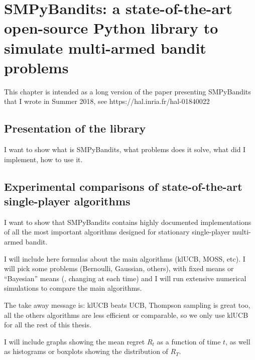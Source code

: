 
\chapter{SMPyBandits: a state-of-the-art open-source Python library to simulate multi-armed bandit problems}
\label{chapter:3}
\minitoc
\newpage
\graphicspath{{2-Chapters/3-Chapter/Images/}}

This chapter is intended as a long version of the paper presenting SMPyBandits that I wrote in Summer 2018, see https://hal.inria.fr/hal-01840022


\section{Presentation of the library}
\label{sec:3:presentationLibrary}

I want to show what is SMPyBandits, what problems does it solve, what did I implement, how to use it.


\section{Experimental comparisons of state-of-the-art single-player algorithms}
\label{sec:3:reviewSPAlgorithms}

I want to show that SMPyBandits contains highly documented implementations of all the most important algorithms designed for stationary single-player multi-armed bandit.

I will include here formulas about the main algorithms (klUCB, MOSS, etc).
I will pick some problems (Bernoulli, Gaussian, others), with fixed means or ``Bayesian'' means (\ie, changing at each time) and I will run extensive numerical simulations to compare the main algorithms.

The take away message is: klUCB beats UCB, Thompson sampling is great too, all the others algorithms are less efficient or comparable, so we only use klUCB for all the rest of this thesis.

I will include graphs showing the mean regret $R_t$ as a function of time $t$, as well as histograms or boxplots showing the distribution of $R_T$.


